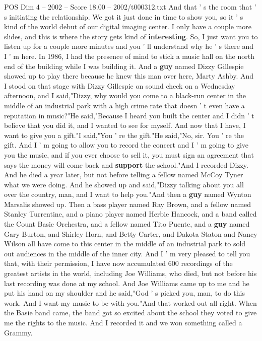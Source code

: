 \begin{textsample}{POS Dim 4 – 2002 – Score 18.00 – 2002/t000312.txt}
And that ' s the room that ' s initiating the relationship.
We got it just done in time to show you, so it ' s kind of the world debut of our digital imaging center.
I only have a couple more slides, and this is where the story gets kind of \textbf{interesting}.
So, I just want you to listen up for a couple more minutes and you ' ll understand why he ' s there and I ' m here.
In 1986, I had the presence of mind to stick a music hall on the north end of the building while I was building it.
And a \textbf{guy} named Dizzy Gillespie showed up to play there because he knew this man over here, Marty Ashby.
And I stood on that stage with Dizzy Gillespie on sound check on a Wednesday afternoon, and I said,"Dizzy, why would you come to a black-run center in the middle of an industrial park with a high crime rate that doesn ' t even have a reputation in music?"He said,"Because I heard you built the center and I didn ' t believe that you did it, and I wanted to see for myself.
And now that I have, I want to give you a gift."I said,"You ' re the gift."He said,"No, sir.
You ' re the gift.
And I ' m going to allow you to record the concert and I ' m going to give you the music, and if you ever choose to sell it, you must sign an agreement that says the money will come back and \textbf{support} the school."And I recorded Dizzy.
And he died a year later, but not before telling a fellow named McCoy Tyner what we were doing.
And he showed up and said,"Dizzy talking about you all over the country, man, and I want to help you."And then a \textbf{guy} named Wynton Marsalis showed up.
Then a bass player named Ray Brown, and a fellow named Stanley Turrentine, and a piano player named Herbie Hancock, and a band called the Count Basie Orchestra, and a fellow named Tito Puente, and a \textbf{guy} named Gary Burton, and Shirley Horn, and Betty Carter, and Dakota Staton and Nancy Wilson all have come to this center in the middle of an industrial park to sold out audiences in the middle of the inner city.
And I ' m very pleased to tell you that, with their permission, I have now accumulated 600 recordings of the greatest artists in the world, including Joe Williams, who died, but not before his last recording was done at my school.
And Joe Williams came up to me and he put his hand on my shoulder and he said,"God ' s picked you, man, to do this work.
And I want my music to be with you."And that worked out all right.
When the Basie band came, the band got so excited about the school they voted to give me the rights to the music.
And I recorded it and we won something called a Grammy.

\end{textsample}
